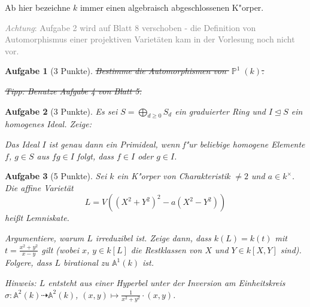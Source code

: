 \documentclass[a4paper, 12pt, numbers=noendperiod, chapterprefix=true]{scrbook}
\theoremstyle{break}
\newtheorem{Aufg}{Aufgabe}
\theoremstyle{nonumberbreak}
\theoremstyle{nonumberplain}
\newcommand{\A}{\mathbb{A}}
\newcommand{\Affine}{\mathbb{A}} %
\DeclareMathOperator{\Projective}{\mathbb{P}} %
\newcommand{\ideal}{\unlhd}
\begin{document}
Ab hier bezeichne $k$ immer einen algebraisch abgeschlossenen K"orper.

\textcolor{gray}{\emph{Achtung}: Aufgabe 2 wird auf Blatt 8 verschoben - die Definition von Automorphismus einer projektiven Variet\"aten kam in der Vorlesung noch nicht vor.}
\begin{Aufg}[3 Punkte]
\sout{Bestimme die Automorphismen von $\Projective^1(k)$.}

\sout{\emph{Tipp:} Benutze Aufgabe 4 von Blatt 5.}
\end{Aufg}

\begin{Aufg}[3 Punkte]
Es sei $S = \bigoplus_{d\geq 0} S_d$ ein graduierter Ring und $I\ideal S$ ein homogenes Ideal. Zeige:

Das Ideal $I$ ist genau dann ein Primideal, wenn f"ur beliebige homogene Elemente $f$, $g\in S$ aus $fg\in I$ folgt, dass $f\in I$ oder $g\in I$.
\end{Aufg}

\begin{Aufg}[5 Punkte]
Sei $k$ ein K"orper von Charakteristik $\neq 2$ und  $a\in k^\times$. Die affine Variet\"at
	\[L = V((X^2+Y^2)^2 - a(X^2-Y^2))\]
hei\ss t \emph{Lemniskate}. 

Argumentiere, warum $L$ irreduzibel ist. Zeige dann, dass $k(L) = k(t)$ mit $t = \frac{x^2+y^2}{x-y}$ gilt (wobei $x$, $y\in k[L]$ die Restklassen von $X$ und $Y\in k[X,Y]$ sind). Folgere, dass $L$ birational zu $\Affine^1(k)$ ist.

\emph{Hinweis: $L$ entsteht aus einer Hyperbel unter der Inversion am Einheitskreis $\sigma: \Affine^2(k) \dashrightarrow \Affine^2(k)$, $(x,y)\mapsto \frac{1}{x^2+y^2}\cdot(x,y)$.}
\end{Aufg}
\end{document}
